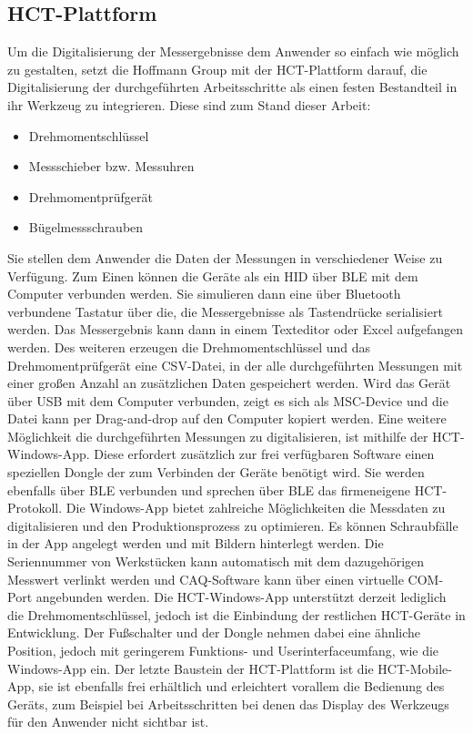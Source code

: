 \subsection{HCT-Plattform}
Um die Digitalisierung der Messergebnisse dem Anwender so einfach wie möglich zu gestalten, setzt die Hoffmann Group mit der \ac{HCT}-Plattform darauf, die Digitalisierung der durchgeführten Arbeitsschritte als einen festen Bestandteil in ihr Werkzeug zu integrieren. Diese sind zum Stand dieser Arbeit: 
\begin{itemize}
	\item Drehmomentschlüssel
	\item Messschieber bzw. Messuhren
	\item Drehmomentprüfgerät
	\item Bügelmessschrauben
\end{itemize}
Sie stellen dem Anwender die Daten der Messungen in verschiedener Weise zu Verfügung. Zum Einen können die Geräte als ein \ac{HID} über \ac{BLE} mit dem Computer verbunden werden. Sie simulieren dann eine über Bluetooth verbundene Tastatur über die, die Messergebnisse als Tastendrücke serialisiert werden. Das Messergebnis kann dann in einem Texteditor oder Excel aufgefangen werden. Des weiteren erzeugen die Drehmomentschlüssel und das Drehmomentprüfgerät eine \ac{CSV}-Datei, in der alle durchgeführten Messungen mit einer großen Anzahl an zusätzlichen Daten gespeichert werden. Wird das Gerät über \ac{USB} mit dem Computer verbunden, zeigt es sich als \ac{MSC}-Device und die Datei kann per Drag-and-drop auf den Computer kopiert werden. Eine weitere Möglichkeit die durchgeführten Messungen zu digitalisieren, ist mithilfe der \ac{HCT}-Windows-App. Diese erfordert zusätzlich zur frei verfügbaren Software einen speziellen Dongle der zum Verbinden der Geräte benötigt wird. Sie werden ebenfalls über \ac{BLE} verbunden und sprechen über \ac{BLE} das firmeneigene \ac{HCT}-Protokoll. Die Windows-App bietet zahlreiche Möglichkeiten die Messdaten zu digitalisieren und den Produktionsprozess zu optimieren. Es können Schraubfälle in der App angelegt werden und mit Bildern hinterlegt werden. Die Seriennummer von Werkstücken kann automatisch mit dem dazugehörigen Messwert verlinkt werden und \ac{CAQ}-Software kann über einen virtuelle COM-Port angebunden werden. Die \ac{HCT}-Windows-App unterstützt derzeit lediglich die Drehmomentschlüssel, jedoch ist die Einbindung der restlichen \ac{HCT}-Geräte in Entwicklung. Der Fußschalter und der Dongle nehmen dabei eine ähnliche Position, jedoch mit geringerem Funktions- und Userinterfaceumfang, wie die Windows-App ein. Der letzte Baustein der \ac{HCT}-Plattform ist die \ac{HCT}-Mobile-App, sie ist ebenfalls frei erhältlich und erleichtert vorallem die Bedienung des Geräts, zum Beispiel bei Arbeitsschritten bei denen das Display des Werkzeugs für den Anwender nicht sichtbar ist.

